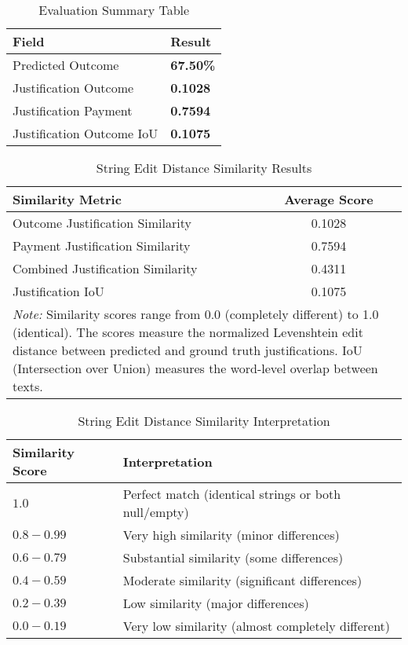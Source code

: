 
\begin{table}[H]
\centering
\caption{Evaluation Summary Table}
\label{tab:evaluation_summary}
\begin{tabular}{@{}lp{2cm}@{}}
\toprule
\textbf{Field} & \textbf{Result} \\
\midrule
Predicted Outcome & \textbf{67.50\%} \\
Justification Outcome &  \textbf{0.1028} \\
Justification Payment &  \textbf{0.7594} \\
Justification Outcome IoU &  \textbf{0.1075} \\
\bottomrule
\end{tabular}
\end{table}

\begin{table}[!ht]
\centering
\caption{String Edit Distance Similarity Results}
\label{tab:string_edit_distance_results}
\begin{tabular}{lc}
\toprule
\textbf{Similarity Metric} & \textbf{Average Score} \\
\midrule
Outcome Justification Similarity & 0.1028 \\
Payment Justification Similarity & 0.7594 \\
Combined Justification Similarity & 0.4311 \\
Justification IoU & 0.1075 \\
\midrule
\multicolumn{2}{p{13cm}}{\textit{Note:} Similarity scores range from 0.0 (completely different) to 1.0 (identical). 
The scores measure the normalized Levenshtein edit distance between predicted and ground truth justifications.
IoU (Intersection over Union) measures the word-level overlap between texts.} \\
\bottomrule
\end{tabular}
\end{table}

\begin{table}[!ht]
\centering
\caption{String Edit Distance Similarity Interpretation}
\label{tab:string_edit_distance_interpretation}
\begin{tabular}{p{3cm}p{10cm}}
\toprule
\textbf{Similarity Score} & \textbf{Interpretation} \\
\midrule
$1.0$ & Perfect match (identical strings or both null/empty) \\
$0.8 - 0.99$ & Very high similarity (minor differences) \\
$0.6 - 0.79$ & Substantial similarity (some differences) \\
$0.4 - 0.59$ & Moderate similarity (significant differences) \\
$0.2 - 0.39$ & Low similarity (major differences) \\
$0.0 - 0.19$ & Very low similarity (almost completely different) \\
\bottomrule
\end{tabular}
\end{table}

